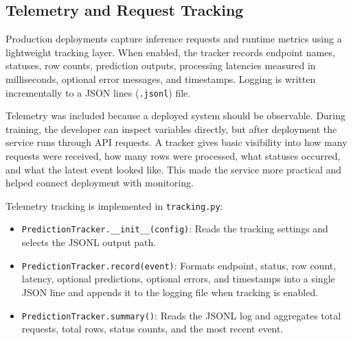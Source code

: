 \documentclass[12pt,a4paper,oneside]{report}
\newcommand{\modulepath}[1]{\texttt{#1}}
\begin{document}
\subsection{Telemetry and Request Tracking}
\noindent Production deployments capture inference requests and runtime metrics using a lightweight tracking layer. When enabled, the tracker records endpoint names, statuses, row counts, prediction outputs, processing latencies measured in milliseconds, optional error messages, and timestamps. Logging is written incrementally to a JSON lines (\texttt{.jsonl}) file.

Telemetry was included because a deployed system should be observable. During training, the developer can inspect variables directly, but after deployment the service runs through API requests. A tracker gives basic visibility into how many requests were received, how many rows were processed, what statuses occurred, and what the latest event looked like. This made the service more practical and helped connect deployment with monitoring.

\noindent Telemetry tracking is implemented in \modulepath{tracking.py}:
\begin{itemize}[leftmargin=*]
  \item \texttt{PredictionTracker.\_\_init\_\_(config)}: Reads the tracking settings and selects the JSONL output path.
  \item \texttt{PredictionTracker.record(event)}: Formats endpoint, status, row count, latency, optional predictions, optional errors, and timestamps into a single JSON line and appends it to the logging file when tracking is enabled.
  \item \texttt{PredictionTracker.summary()}: Reads the JSONL log and aggregates total requests, total rows, status counts, and the most recent event.
\end{itemize}
\end{document}
